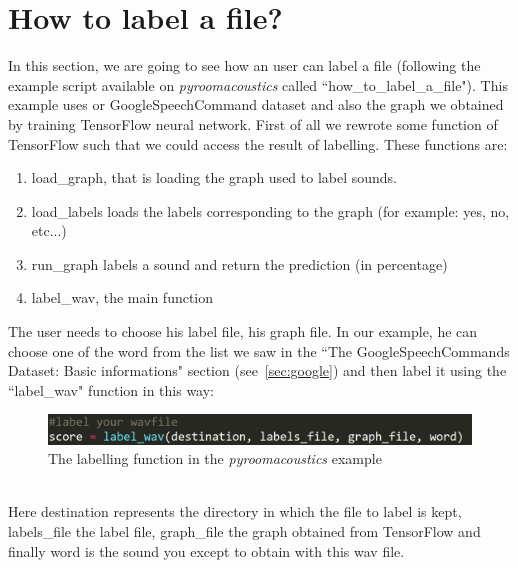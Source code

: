 \documentclass[11pt,a4paper,titlepage]{report}
\providecommand{\tightlist}{%
	\setlength{\itemsep}{0pt}\setlength{\parskip}{0pt}}
\begin{document}
\section{How to label a file?}
\label{sec:label_file}
\hspace*{0.6cm}
In this section, we are going to see how an user can label a file (following the example script available on \textit{pyroomacoustics} called ``how\_to\_label\_a\_file"). This example uses or GoogleSpeechCommand dataset and also the graph we obtained by training TensorFlow neural network.
First of all we rewrote some function of TensorFlow such that we could access the result of labelling. These functions are:
\begin{enumerate}
	\tightlist
	\item load\_graph, that is loading the graph used to label sounds.
	\item load\_labels loads the labels corresponding to the graph (for example: yes, no, etc...)
	\item run\_graph labels a sound and return the prediction (in percentage)
	\item label\_wav, the main function
\end{enumerate}
\hspace*{0.6cm}
The user needs to choose his label file, his graph file. In our example, he can choose one of the word from the list we saw in the ``The GoogleSpeechCommands Dataset: Basic informations" section (see~\ref{sec:google}) and then label it using the ``label\_wav" function in this way:\\
\begin{figure}[h!]
	\centering
	\includegraphics[width=0.7\linewidth]{Rapport8}
	\caption{The labelling function in the \textit{pyroomacoustics} example}
	\label{fig:rapport8}
\end{figure}\\
Here destination represents the directory in which the file to label is kept, labels\_file the label file, graph\_file the graph obtained from TensorFlow and finally word is the sound you except to obtain with this wav file.
\end{document}
